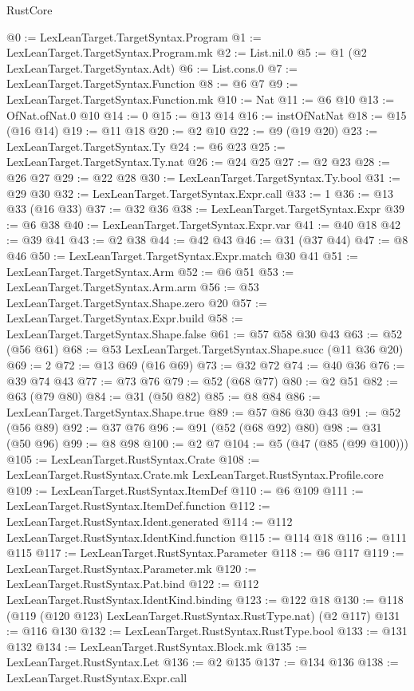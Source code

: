\begin{lexlean}{RustCore}
\begin{coremodule}
@0 := LexLeanTarget.TargetSyntax.Program
@1 := LexLeanTarget.TargetSyntax.Program.mk
@2 := List.nil.{0}
@5 := @1 (@2 LexLeanTarget.TargetSyntax.Adt)
@6 := List.cons.{0}
@7 := LexLeanTarget.TargetSyntax.Function
@8 := @6 @7
@9 := LexLeanTarget.TargetSyntax.Function.mk
@10 := Nat
@11 := @6 @10
@13 := OfNat.ofNat.{0} @10
@14 := 0
@15 := @13 @14
@16 := instOfNatNat
@18 := @15 (@16 @14)
@19 := @11 @18
@20 := @2 @10
@22 := @9 (@19 @20)
@23 := LexLeanTarget.TargetSyntax.Ty
@24 := @6 @23
@25 := LexLeanTarget.TargetSyntax.Ty.nat
@26 := @24 @25
@27 := @2 @23
@28 := @26 @27
@29 := @22 @28
@30 := LexLeanTarget.TargetSyntax.Ty.bool
@31 := @29 @30
@32 := LexLeanTarget.TargetSyntax.Expr.call
@33 := 1
@36 := @13 @33 (@16 @33)
@37 := @32 @36
@38 := LexLeanTarget.TargetSyntax.Expr
@39 := @6 @38
@40 := LexLeanTarget.TargetSyntax.Expr.var
@41 := @40 @18
@42 := @39 @41
@43 := @2 @38
@44 := @42 @43
@46 := @31 (@37 @44)
@47 := @8 @46
@50 := LexLeanTarget.TargetSyntax.Expr.match @30 @41
@51 := LexLeanTarget.TargetSyntax.Arm
@52 := @6 @51
@53 := LexLeanTarget.TargetSyntax.Arm.arm
@56 := @53 LexLeanTarget.TargetSyntax.Shape.zero @20
@57 := LexLeanTarget.TargetSyntax.Expr.build
@58 := LexLeanTarget.TargetSyntax.Shape.false
@61 := @57 @58 @30 @43
@63 := @52 (@56 @61)
@68 := @53 LexLeanTarget.TargetSyntax.Shape.succ (@11 @36 @20)
@69 := 2
@72 := @13 @69 (@16 @69)
@73 := @32 @72
@74 := @40 @36
@76 := @39 @74 @43
@77 := @73 @76
@79 := @52 (@68 @77)
@80 := @2 @51
@82 := @63 (@79 @80)
@84 := @31 (@50 @82)
@85 := @8 @84
@86 := LexLeanTarget.TargetSyntax.Shape.true
@89 := @57 @86 @30 @43
@91 := @52 (@56 @89)
@92 := @37 @76
@96 := @91 (@52 (@68 @92) @80)
@98 := @31 (@50 @96)
@99 := @8 @98
@100 := @2 @7
@104 := @5 (@47 (@85 (@99 @100)))
@105 := LexLeanTarget.RustSyntax.Crate
@108 := LexLeanTarget.RustSyntax.Crate.mk LexLeanTarget.RustSyntax.Profile.core
@109 := LexLeanTarget.RustSyntax.ItemDef
@110 := @6 @109
@111 := LexLeanTarget.RustSyntax.ItemDef.function
@112 := LexLeanTarget.RustSyntax.Ident.generated
@114 := @112 LexLeanTarget.RustSyntax.IdentKind.function
@115 := @114 @18
@116 := @111 @115
@117 := LexLeanTarget.RustSyntax.Parameter
@118 := @6 @117
@119 := LexLeanTarget.RustSyntax.Parameter.mk
@120 := LexLeanTarget.RustSyntax.Pat.bind
@122 := @112 LexLeanTarget.RustSyntax.IdentKind.binding
@123 := @122 @18
@130 := @118 (@119 (@120 @123) LexLeanTarget.RustSyntax.RustType.nat) (@2 @117)
@131 := @116 @130
@132 := LexLeanTarget.RustSyntax.RustType.bool
@133 := @131 @132
@134 := LexLeanTarget.RustSyntax.Block.mk
@135 := LexLeanTarget.RustSyntax.Let
@136 := @2 @135
@137 := @134 @136
@138 := LexLeanTarget.RustSyntax.Expr.call

\end{coremodule}
\end{lexlean}
